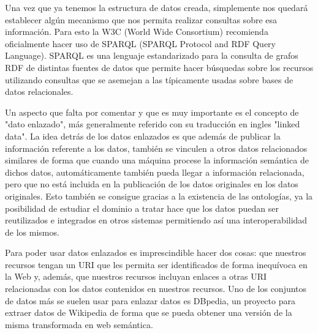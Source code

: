 \bigskip
Una vez que ya tenemos la estructura de datos creada, simplemente nos quedará establecer algún mecanismo que nos permita realizar consultas sobre esa información. Para esto la W3C (World Wide Consortium) recomienda oficialmente hacer uso de SPARQL (SPARQL Protocol and RDF Query Language). SPARQL es una lenguaje estandarizado para la consulta de grafos RDF de distintas fuentes de datos que permite hacer búsquedas sobre los recursos utilizando consultas que se asemejan a las típicamente usadas sobre bases de datos relacionales.

\bigskip

Un aspecto que falta por comentar y que es muy importante es el concepto de "dato enlazado", más generalmente referido con su traducción en ingles "linked data". La idea detrás de los datos enlazados es que además de publicar la información referente a los datos, también se vinculen a otros datos relacionados similares de forma que cuando una máquina procese la información semántica de dichos datos, automáticamente también pueda llegar a información relacionada, pero que no está incluida en la publicación de los datos originales en los datos originales. Esto también se consigue gracias a la existencia de las ontologías, ya la posibilidad de estudiar el dominio a tratar hace que los datos puedan ser reutilizados e integrados en otros sistemas permitiendo así una interoperabilidad de los mismos.

\bigskip
Para poder usar datos enlazados es imprescindible hacer dos cosas: que nuestros recursos tengan un URI que les permita ser identificados de forma inequívoca en la Web y, además, que nuestros recursos incluyan enlaces a otras URI relacionadas con los datos contenidos en nuestros recursos. Uno de los conjuntos de datos más se suelen usar para enlazar datos es DBpedia, un proyecto para extraer datos de Wikipedia de forma que se pueda obtener una versión de la misma transformada en web semántica.

